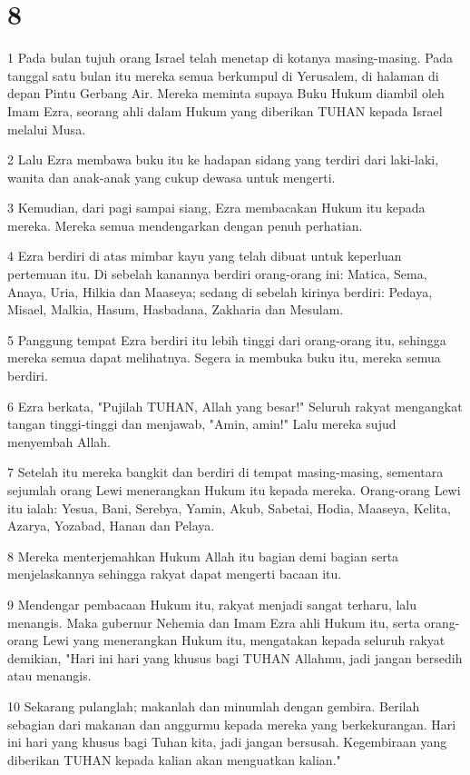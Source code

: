 \chapter{8}

\par 1 Pada bulan tujuh orang Israel telah menetap di kotanya masing-masing. Pada tanggal satu bulan itu mereka semua berkumpul di Yerusalem, di halaman di depan Pintu Gerbang Air. Mereka meminta supaya Buku Hukum diambil oleh Imam Ezra, seorang ahli dalam Hukum yang diberikan TUHAN kepada Israel melalui Musa.
\par 2 Lalu Ezra membawa buku itu ke hadapan sidang yang terdiri dari laki-laki, wanita dan anak-anak yang cukup dewasa untuk mengerti.
\par 3 Kemudian, dari pagi sampai siang, Ezra membacakan Hukum itu kepada mereka. Mereka semua mendengarkan dengan penuh perhatian.
\par 4 Ezra berdiri di atas mimbar kayu yang telah dibuat untuk keperluan pertemuan itu. Di sebelah kanannya berdiri orang-orang ini: Matica, Sema, Anaya, Uria, Hilkia dan Maaseya; sedang di sebelah kirinya berdiri: Pedaya, Misael, Malkia, Hasum, Hasbadana, Zakharia dan Mesulam.
\par 5 Panggung tempat Ezra berdiri itu lebih tinggi dari orang-orang itu, sehingga mereka semua dapat melihatnya. Segera ia membuka buku itu, mereka semua berdiri.
\par 6 Ezra berkata, "Pujilah TUHAN, Allah yang besar!" Seluruh rakyat mengangkat tangan tinggi-tinggi dan menjawab, "Amin, amin!" Lalu mereka sujud menyembah Allah.
\par 7 Setelah itu mereka bangkit dan berdiri di tempat masing-masing, sementara sejumlah orang Lewi menerangkan Hukum itu kepada mereka. Orang-orang Lewi itu ialah: Yesua, Bani, Serebya, Yamin, Akub, Sabetai, Hodia, Maaseya, Kelita, Azarya, Yozabad, Hanan dan Pelaya.
\par 8 Mereka menterjemahkan Hukum Allah itu bagian demi bagian serta menjelaskannya sehingga rakyat dapat mengerti bacaan itu.
\par 9 Mendengar pembacaan Hukum itu, rakyat menjadi sangat terharu, lalu menangis. Maka gubernur Nehemia dan Imam Ezra ahli Hukum itu, serta orang-orang Lewi yang menerangkan Hukum itu, mengatakan kepada seluruh rakyat demikian, "Hari ini hari yang khusus bagi TUHAN Allahmu, jadi jangan bersedih atau menangis.
\par 10 Sekarang pulanglah; makanlah dan minumlah dengan gembira. Berilah sebagian dari makanan dan anggurmu kepada mereka yang berkekurangan. Hari ini hari yang khusus bagi Tuhan kita, jadi jangan bersusah. Kegembiraan yang diberikan TUHAN kepada kalian akan menguatkan kalian."
